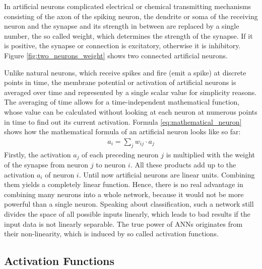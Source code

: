 \documentclass[11pt, a4paper]{article}
\begin{document}

\vspace{-0.2cm}
In artificial neurons complicated electrical or chemical transmitting mechanisms consisting of the axon of the spiking neuron, the dendrite or soma of the receiving neuron and the synapse and its strength in between are replaced by a single number, the so called weight, which determines the strength of the synapse. If it is positive, the synapse or connection is excitatory, otherwise it is inhibitory. Figure \ref{fig:two_neurons_weight} shows two connected artificial neurons.



 Unlike natural neurons, which receive spikes and fire (emit a spike) at discrete points in time, the membrane potential or activation of artificial neurons is averaged over time and represented by a single scalar value for simplicity reasons. The averaging of time allows for a time-independent mathematical function, whose value can be calculated without looking at each neuron at numerous points in time to find out its current activation. Formula \eqref{eq:mathematical_neuron} shows how the mathematical formula of an artificial neuron looks like so far:
\begin{align}
\label{eq:mathematical_neuron}
a_i = \sum_j w_{ij} \cdot a_j
\end{align}
Firstly, the activation $a_j$ of each preceding neuron $j$ is multiplied with the weight of the synapse from neuron $j$ to neuron $i$. All these products add up to the activation $a_i$ of neuron $i$. Until now artificial neurons are linear units. Combining them yields a completely linear function. Hence, there is no real advantage in combining many neurons into a whole network, because it would not be more powerful than a single neuron. Speaking about classification, such a network still divides the space of all possible inputs linearly, which leads to bad results if the input data is not linearly separable. The true power of \acp{ANN} originates from their non-linearity, which is induced by so called activation functions.

\subsection{Activation Functions}
\end{document}
